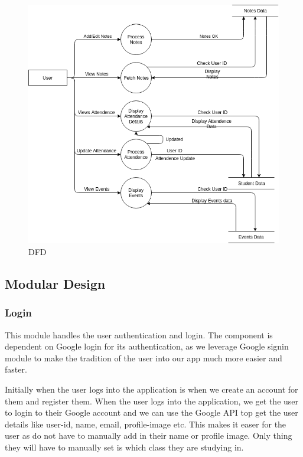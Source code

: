 \documentclass{article}
\begin{document}
\begin{figure}
  \includegraphics[width=\linewidth]{DFD2.png}
  \caption{DFD}
\end{figure}

\subsection{Modular Design}

\subsubsection{Login}
This module handles the user authentication and login.
The component is dependent on Google login for its authentication, as we leverage Google signin module to make the tradition of the user into our app much more easier and faster.

Initially when the user logs into the application is when we create an account for them and register them. When the user logs into the application, we get the user to login to their Google account and we can use the Google API top get the user details like user-id, name, email, profile-image etc. This makes it easer for the user as do not have to manually add in their name or profile image. Only thing they will have to manually set is which class they are studying in.
\end{document}
